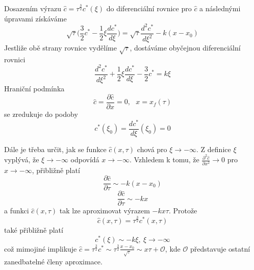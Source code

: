 \documentclass[a4paper]{book}
\begin{document}
Dosazením výrazu $\hat{c} = \tau^{\frac{3}{2}}c^*(\xi)$ do diferenciální rovnice pro $\hat{c}$ a následnými úpravami získáváme
\begin{equation*}
\sqrt{\tau}\Bigg( \frac{3}{2}c^* - \frac{1}{2} \xi \frac{d c^*}{d \xi} \Bigg) = \sqrt{\tau} \frac{d^2 c^*}{d \xi^2} - k(x - x_0)
\end{equation*}
Jestliže obě strany rovnice vydělíme $\sqrt{\tau}$, dostáváme obyčejnou diferenciální rovnici
\begin{equation}
\frac{d^2 c^*}{d \xi^2} + \frac{1}{2}\xi\frac{d c^*}{d \xi} - \frac{3}{2}c^* = k \xi
\end{equation}
Hraniční podmínka
\begin{equation*}
\hat{c} = \frac{\partial \hat{c}}{\partial x} = 0,~~~x = x_f(\tau)
\end{equation*}
se zredukuje do podoby
\begin{equation*}
c^*(\xi_0) = \frac{d c^*}{d \xi}(\xi_0) = 0
\end{equation*}

Dále je třeba určit, jak se funkce $\hat{c}(x, \tau)$ chová pro $\xi \rightarrow -\infty$. Z definice $\xi$ vyplývá, že $\xi \rightarrow -\infty$ odpovídá $x \rightarrow -\infty$. Vzhledem k tomu, že $\frac{\partial^2 \hat{c}}{\partial x^2} \rightarrow 0$ pro $x \rightarrow -\infty$, přibližně platí
\begin{equation*}
\frac{\partial \hat{c}}{\partial \tau} \sim -k(x - x_0)
\end{equation*}
\begin{equation*}
\frac{\partial \hat{c}}{\partial \tau} \sim -kx
\end{equation*}
 a funkci $\hat{c}(x, \tau)$ tak lze aproximovat výrazem $-kx\tau$. Protože
\begin{equation*}
\hat{c}(x, \tau) = \tau^{\frac{3}{2}}c^*(x, \tau)
\end{equation*}
také přibližně platí
\begin{equation*}
c^*(\xi) \sim -k \xi,~\xi \rightarrow -\infty
\end{equation*}
což mimojiné implikuje $\hat{c} = \tau^{\frac{3}{2}}c^* \sim \tau^{\frac{3}{2}} \frac{x - x_0}{\sqrt{\tau}} \sim x \tau + \mathcal{O}$, kde $\mathcal{O}$ představuje ostatní zanedbatelné členy aproximace.
\end{document}
